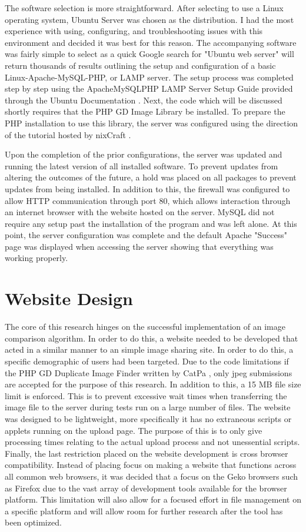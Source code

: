 The software selection is more straightforward. After selecting to use a Linux operating system, Ubuntu Server was chosen as the distribution. I had the most experience with using, configuring, and troubleshooting issues with this environment and decided it was best for this reason. The accompanying software was fairly simple to select as a quick Google search for "Ubuntu web server" will return thousands of results outlining the setup and configuration of a basic Linux-Apache-MySQL-PHP, or LAMP server. The setup process was completed step by step using the ApacheMySQLPHP LAMP Server Setup Guide provided through the Ubuntu Documentation \cite{ubuntu:lampsetup}. Next, the code which will be discussed shortly requires that the PHP GD Image Library be installed. To prepare the PHP installation to use this library, the server was configured using the direction of the tutorial hosted by nixCraft \cite{nix:gdsetup}.

Upon the completion of the prior configurations, the server was updated and running the latest version of all installed software. To prevent updates from altering the outcomes of the future, a hold was placed on all packages to prevent updates from being installed. In addition to this, the firewall was configured to allow HTTP communication through port 80, which allows interaction through an internet browser with the website hosted on the server. MySQL did not require any setup past the installation of the program and was left alone. At this point, the server configuration was complete and the default Apache "Success" page was displayed when accessing the server showing that everything was working properly.

\section{Website Design} \label{sec:websitedesign}
The core of this research hinges on the successful implementation of an image comparison algorithm. In order to do this, a website needed to be developed that acted in a similar manner to an simple image sharing site. In order to do this, a specific demographic of users had been targeted. Due to the code limitations if the PHP GD Duplicate Image Finder written by CatPa \cite{catpa:gdcode}, only jpeg submissions are accepted for the purpose of this research. In addition to this, a 15 MB file size limit is enforced. This is to prevent excessive wait times when transferring the image file to the server during tests run on a large number of files. The website was designed to be lightweight, more specifically it has no extraneous scripts or applets running on the upload page. The purpose of this is to only give processing times relating to the actual upload process and not unessential scripts. Finally, the last restriction placed on the website development is cross browser compatibility. Instead of placing focus on making a website that functions across all common web browsers, it was decided that a focus on the Geko browsers such as Firefox due to the vast array of development tools available for the browser platform. This limitation will also allow for a focused effort in file management on a specific platform and will allow room for further research after the tool has been optimized.

